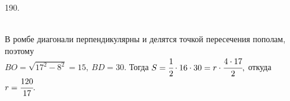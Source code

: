 190. \begin{figure}[ht!]
\end{figure}\\
В ромбе диагонали перпендикулярны и делятся точкой пересечения пополам, поэтому\\ $BO=\sqrt{17^2-8^2}=15,\ BD=30.$ Тогда $S=\cfrac{1}{2}\cdot16\cdot30=r\cdot\cfrac{4\cdot17}{2},$ откуда $r=\cfrac{120}{17}.$\\
